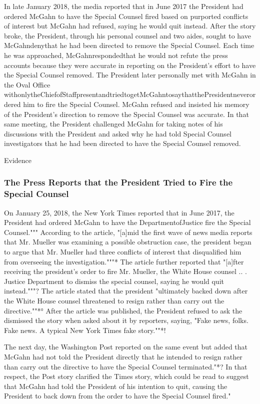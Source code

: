 In late January 2018, the media reported that in June 2017 the President had ordered McGahn to have the Special Counsel fired based on purported conflicts of interest but McGahn had refused, saying he would quit instead.
After the story broke, the President, through his personal counsel and two aides, sought to have McGahndenythat he had been directed to remove the Special Counsel.
Each time he was approached, McGahnrespondedthat he would not refute the press accounts because they were accurate in reporting on the President's effort to have the Special Counsel removed.
The President later personally met with McGahn in the Oval Office withonlytheChiefofStaffpresentandtriedtogetMcGahntosaythatthePresidentneverordered him to fire the Special Counsel.
McGahn refused and insisted his memory of the President's direction to remove the Special Counsel was accurate.
In that same meeting, the President challenged McGahn for taking notes of his discussions with the President and asked why he had told Special Counsel investigators that he had been directed to have the Special Counsel removed.

Evidence

\subsubsection{The Press Reports that the President Tried to Fire the Special Counsel}

On January 25, 2018, the New York Times reported that in June 2017, the President had ordered McGahn to have the DepartmentofJustice fire the Special Counsel."""
According to the article, "[a]mid the first wave of news media reports that Mr. Mueller was examining a possible obstruction case, the president began to argue that Mr. Mueller had three conflicts of interest that disqualified him from overseeing the investigation."""*
The article further reported that "[a]fter
receiving the president's order to fire Mr. Mueller, the White House counsel .. .
Justice Department to dismiss the special counsel, saying he would quit instead."""?
The article stated that the president "ultimately backed down after the White House counsel threatened to resign rather than carry out the directive.""*°
After the article was published, the President
refused to ask the
dismissed the story when asked about it by reporters, saying, "Fake news, folks.
Fake news.
A typical New York Times fake story.""*!

The next day, the Washington Post reported on the same event but added that McGahn had not told the President directly that he intended to resign rather than carry out the directive to have the Special Counsel terminated."*?
In that respect, the Post story clarified the Times story, which could be read to suggest that McGahn had told the President of his intention to quit, causing the President to back down from the order to have the Special Counsel fired."

